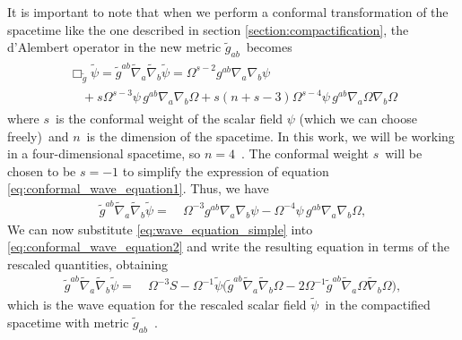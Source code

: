 It is important to note that when we perform a conformal transformation of the spacetime like the one described in section \ref{section:compactification}, the d'Alembert operator in the new metric $\tilde{g}_{ab}$~becomes
%
\begin{align}
    \begin{split}
        \Box_{\tilde{g}} \tilde{\psi} = \tilde{g}^{ab} \tilde{\nabla}_a \tilde{\nabla}_b \tilde{\psi} 
        = \Omega^{s-2} g^{ab} \nabla_a \nabla_b \psi \\
        \quad + s \Omega^{s-3} \psi\, g^{ab} \nabla_a \nabla_b \Omega 
        + s(n + s - 3) \Omega^{s-4} \psi\, g^{ab} \nabla_a \Omega \nabla_b \Omega
        \label{eq:conformal_wave_equation1}
    \end{split}
\end{align}
%
where $s$~is the conformal weight of the scalar field $\psi$ (which we can choose freely)~and $n$~is the dimension of the spacetime. In this work, we will be working in a four-dimensional spacetime, so $n = 4$~. The conformal weight $s$~will be chosen to be $s = -1$ to simplify the expression of equation \eqref{eq:conformal_wave_equation1}. Thus, we have
%
\begin{align}
    \tilde{g}^{ab} \tilde{\nabla}_a \tilde{\nabla}_b \tilde{\psi} 
 =&~\Omega^{-3} g^{ab} \nabla_a \nabla_b \psi 
 - \Omega^{-4} \psi\, g^{ab} \nabla_a \nabla_b \Omega,
    \label{eq:conformal_wave_equation2}
\end{align}
%
We can now substitute \eqref{eq:wave_equation_simple} into \eqref{eq:conformal_wave_equation2} and write the resulting equation in terms of the rescaled quantities, obtaining
%
\begin{align}
    \tilde{g}^{ab} \tilde{\nabla}_a \tilde{\nabla}_b \tilde{\psi} 
 =&~\Omega^{-3} S 
 - \Omega^{-1} \tilde{\psi} \bigg( 
    \tilde{g}^{ab} \tilde{\nabla}_a \tilde{\nabla}_b \Omega 
 - 2 \Omega^{-1} \tilde{g}^{ab} \tilde{\nabla}_a \Omega \tilde{\nabla}_b \Omega \bigg),
\end{align}
%
which is the wave equation for the rescaled scalar field $\tilde{\psi}$~in the compactified spacetime with metric $\tilde{g}_{ab}$~.

